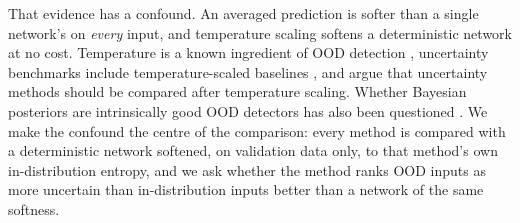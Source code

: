 \documentclass[10pt]{article}
\begin{document}
That evidence has a confound. An averaged prediction is softer than a single
network's on \emph{every} input, and temperature scaling
\citep{guo2017calibration} softens a deterministic network at no cost.
Temperature is a known ingredient of OOD detection
\citep{liang2018enhancing}, uncertainty benchmarks include temperature-scaled
baselines \citep{ovadia2019can}, and \citet{ashukha2020pitfalls} argue that
uncertainty methods should be compared after temperature scaling. Whether
Bayesian posteriors are intrinsically good OOD detectors has also been
questioned \citep{henning2021bayesian}. We make the confound the centre of
the comparison: every method is compared with a deterministic network
softened, on validation data only, to that method's own in-distribution
entropy, and we ask whether the method ranks OOD inputs as more uncertain
than in-distribution inputs better than a network of the same softness.
\end{document}

